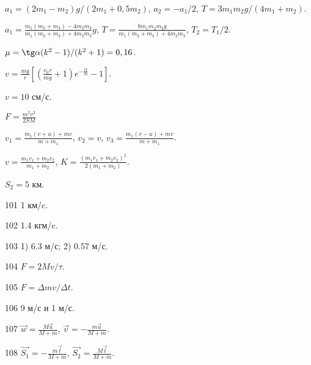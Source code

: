 \begin{Answer}{86}
$a_1 = (2m_1-m_2)g/(2m_1+0,5m_2)$, $a_2 = -a_1/2$, $T=3m_1 m_2g/(4m_1 + m_2)$.
\end{Answer}
\begin{Answer}{87}
$a_1 = \frac{m_1(m_2+m_3)-4m_2m_3}{m_1(m_2+m_3)+4m_2m_3}g$, $T= \frac{8m_1m_2m_3g}{m_1(m_2+m_3)+4m_2m_3}$, $T_2 = T_1/2$.
\end{Answer}
\begin{Answer}{88}
$\mu = \tg \alpha (k^2-1)/(k^2+1) = 0,16$.
\end{Answer}
\begin{Answer}{89}
$v = \frac{mg}{r}\left[ \left( \frac{v_0r}{mg} +1 \right)e^{-\frac{rt}{m}} - 1 \right]$.
\end{Answer}
\begin{Answer}{90}
$v=10$ см/с.
\end{Answer}
\begin{Answer}{91}
$F = \frac{m^2 v^2}{2SM}$
\end{Answer}
\begin{Answer}{92}
$v_1 = \frac{m_1(v+u)+mv}{m+m_1}$, $v_2 = v$, $v_3 = \frac{m_1(v-u)+mv}{m+m_1}$.
\end{Answer}
\begin{Answer}{93}
$v = \frac{m_1v_1 + m_2v_2}{m_1+m_2}$, $K = \frac{(m_1v_1+m_2v_2)^2}{2(m_1+m_2)}$.
\end{Answer}
\begin{Answer}{94}
$S_2 = 5$ км.
\end{Answer}
\begin{Answer}{101}
1 км/c.
\end{Answer}
\begin{Answer}{102}
1.4 кгм/c.
\end{Answer}
\begin{Answer}{103}
1) 6.3 м/с; 2) 0.57 м/с.
\end{Answer}
\begin{Answer}{104}
$F = 2Mv/\tau$.
\end{Answer}
\begin{Answer}{105}
$F = \Delta m v/ \Delta t$.
\end{Answer}
\begin{Answer}{106}
9 м/с и 1 м/с.
\end{Answer}
\begin{Answer}{107}
$\vec{w} = \frac{M\vec{u}}{M+m}$, $\vec{v} = -\frac{m\vec{u}}{M+m}$.
\end{Answer}
\begin{Answer}{108}
$\vec{S_1} = -\frac{m\vec{l}}{M+m}$, $\vec{S_2} = \frac{M\vec{l}}{M+m}$.
\end{Answer}
